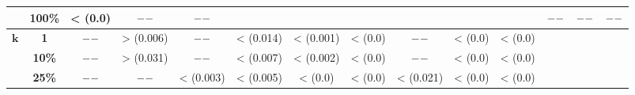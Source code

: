 \begin{table}[htbp]
{{\begin{tabular}{cccccccccccccc}
			& \textbf{100\%} & < (0.0) & $\---$ & $\---$ &       &       &       &       &       &       & $\---$ & $\---$ & $\---$ \\
	  \midrule
	  \multirow{3}[2]{*}{$\bm{k}$} & \textbf{1} & $\---$ & > (0.006) & $\---$ & < (0.014) & < (0.001) & < (0.0) & $\---$ & < (0.0) & < (0.0) &       &       &  \\
			& \textbf{10\%} & $\---$ & > (0.031) & $\---$ & < (0.007) & < (0.002) & < (0.0) & $\---$ & < (0.0) & < (0.0) &       &       &  \\
			& \textbf{25\%} & $\---$ & $\---$ & < (0.003) & < (0.005) & < (0.0) & < (0.0) & < (0.021) & < (0.0) & < (0.0) &       &       &  \\
	  \bottomrule
	  \end{tabular}}}%

\end{table}%
